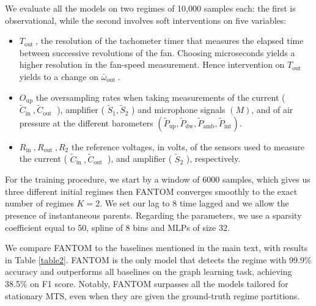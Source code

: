We evaluate all the models on two regimes of 10,000 samples each: the first is observational, while the second involves soft interventions on five variables: 
\begin{itemize}
    \item $T_{\text {out }}$, the resolution of the tachometer timer that measures the elapsed time between successive revolutions of the fan. Choosing microseconds yields a higher resolution in the fan-speed measurement. Hence intervention on $T_{\text {out }}$ yields to a change on $\bar{\omega}_{\text {out }}$.
    \item $O_{\mathrm{up}}$ the oversampling rates when taking measurements of the current ( $\tilde{C}_{\text {in }}, \tilde{C}_{\text {out }}$ ), amplifier ( $\tilde{S}_1, \tilde{S}_2$ ) and microphone signals $(M)$, and of air pressure at the different barometers $\left(\tilde{P}_{\mathrm{up}}, \tilde{P}_{\mathrm{dw}}, \tilde{P}_{\mathrm{amb}}, \tilde{P}_{\mathrm{int}}\right)$.
    \item $R_{\text {in }}, R_{\text {out }}, R_2$ the reference voltages, in volts, of the sensors used to measure the current ( $\tilde{C}_{\text {in }}, \tilde{C}_{\text {out }}$ ), and amplifier ( $\tilde{S}_2$ ), respectively.
\end{itemize} 

For the training procedure, we start by a window of 6000 samples, which gives us three different initial regimes then FANTOM converges smoothly to the exact number of regimes $K=2$. We set our lag to 8 time lagged and we allow the presence of instantaneous parents. Regarding the parameters, we use a sparsity coefficient equal to 50, spline of 8 bins and MLPs of size 32.

We compare FANTOM to the baselines mentioned in the main text, with results in Table \ref{table2}. FANTOM is the only model that detects the regime with 99.9\% accuracy and outperforms all baselines on the graph learning task, achieving 38.5\% on F1 score. Notably, FANTOM surpasses all the models tailored for stationary MTS, even when they are given the ground-truth regime partitions. 

